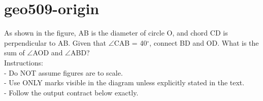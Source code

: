 \documentclass[12pt]{article}
\begin{document}
\section*{geo509-origin}
\noindent\begin{minipage}{\textwidth}
\setlength{\parskip}{4pt}
As shown in the figure, AB is the diameter of circle O, and chord CD is perpendicular to AB. Given that \ensuremath{\angle }CAB = 40\ensuremath{^\circ}, connect BD and OD. What is the sum of \ensuremath{\angle }AOD and \ensuremath{\angle }ABD?\\
Instructions:\\
- Do NOT assume figures are to scale.\\
- Use ONLY marks visible in the diagram unless explicitly stated in the text.\\
- Follow the output contract below exactly.\\
\end{minipage}
\end{document}
